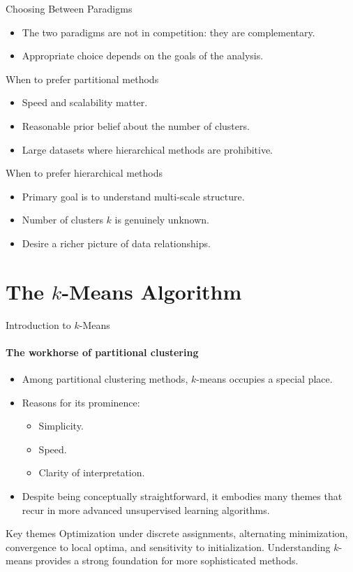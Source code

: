 \begin{frame}{Choosing Between Paradigms}
  \begin{itemize}
    \item The two paradigms are \alert{not in competition}: they are complementary.
    \item Appropriate choice depends on the goals of the analysis.
  \end{itemize}
  \begin{block}{When to prefer partitional methods}
    \begin{itemize}
      \item Speed and scalability matter.
      \item Reasonable prior belief about the number of clusters.
      \item Large datasets where hierarchical methods are prohibitive.
    \end{itemize}
  \end{block}
  \begin{block}{When to prefer hierarchical methods}
    \begin{itemize}
      \item Primary goal is to understand multi-scale structure.
      \item Number of clusters $k$ is genuinely unknown.
      \item Desire a richer picture of data relationships.
    \end{itemize}
  \end{block}
\end{frame}

\section{The $k$-Means Algorithm}

\begin{frame}{Introduction to $k$-Means}
  \framesubtitle{The workhorse of partitional clustering}
  \begin{itemize}
    \item Among partitional clustering methods, \alert{$k$-means} occupies a special place.
    \item Reasons for its prominence:
      \begin{itemize}
        \item Simplicity.
        \item Speed.
        \item Clarity of interpretation.
      \end{itemize}
    \item Despite being conceptually straightforward, it embodies many themes that recur in
          more advanced unsupervised learning algorithms.
  \end{itemize}
  \begin{block}{Key themes}
    Optimization under discrete assignments, alternating minimization, convergence to local
    optima, and sensitivity to initialization. Understanding $k$-means provides a strong
    foundation for more sophisticated methods.
  \end{block}
\end{frame}

